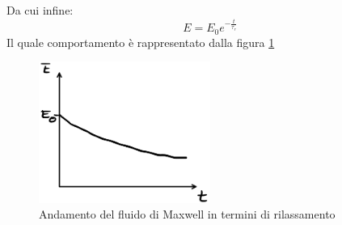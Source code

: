 Da cui infine:
\begin{equation}
E=E_0 e^{-\frac{t}{\tau_r}}
\end{equation}
Il quale comportamento è rappresentato dalla figura \ref{fig:RilassamentoMaxwell}
\begin{figure}
\centering
\includegraphics[width = 0.5\textwidth]{gfx/RilassamentoMaxwell}
\caption{Andamento del fluido di Maxwell in termini di rilassamento}
\label{fig:RilassamentoMaxwell}
\end{figure}